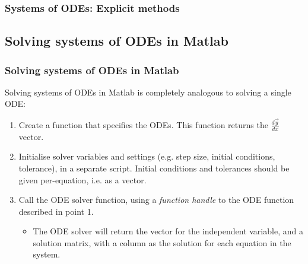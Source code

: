 \documentclass[11pt,table,final,fleqn,xcolor={usenames,dvipsnames,table}]{beamer}
\begin{document}
\begin{frame}
  \frametitle{Systems of ODEs: Explicit methods}
\end{frame}

\subsection{Solving systems of ODEs in Matlab}
\begin{frame}
  \frametitle{Solving systems of ODEs in Matlab}
  Solving systems of ODEs in Matlab is completely analogous to solving a single ODE:
  \vspace*{1em}
  \begin{enumerate}
    \item Create a function that specifies the ODEs. This function returns the $\frac{d\vec{y}}{dx}$ vector.
    \item Initialise solver variables and settings (e.g. step size, initial conditions, tolerance), in a separate script. Initial conditions and tolerances should be given per-equation, i.e. as a vector.
    \item Call the ODE solver function, using a \emph{function handle} to the ODE function described in point 1.
    \begin{itemize}
      \item The ODE solver will return the vector for the independent variable, and a solution matrix, with a column as the solution for each equation in the system.
    \end{itemize}
  \end{enumerate}
\end{frame}
\end{document}
